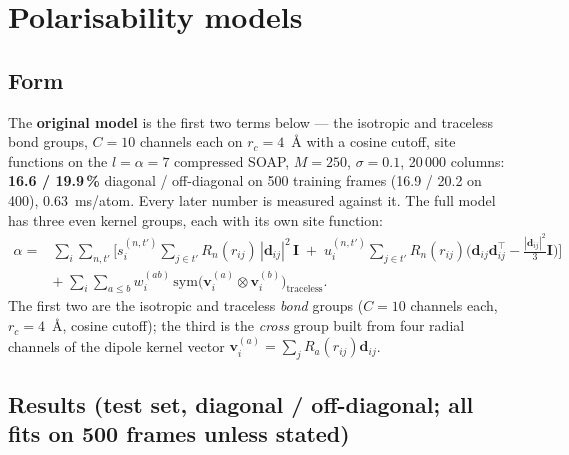 \documentclass[11pt,a4paper]{article}
\begin{document}
\section{Polarisability models}\label{sec:pol}

\subsection{Form}\label{sec:pol-form}

The \textbf{original model} is the first two terms below --- the isotropic and traceless bond
groups, $C=10$ channels each on $r_c=4$~\AA{} with a cosine cutoff, site functions on the
$l=\alpha=7$ compressed SOAP, $M=250$, $\sigma=0.1$, 20\,000 columns: \textbf{16.6 / 19.9\,\%}
diagonal / off-diagonal on 500 training frames (16.9 / 20.2 on 400), 0.63~ms/atom. Every later
number is measured against it. The full model has three even kernel groups, each with its own site
function:
\begin{equation}
\begin{array}{rl}
\alpha = & \displaystyle \sum_i\sum_{n,t'}\Big[
 s^{(n,t')}_i \sum_{j\in t'} R_n(r_{ij})\,|\mathbf d_{ij}|^2\,\mathbf I
\;+\;
 u^{(n,t')}_i \sum_{j\in t'} R_n(r_{ij})\Big(\mathbf d_{ij}\mathbf d_{ij}^\top - \frac{|\mathbf d_{ij}|^2}{3}\mathbf I\Big)\Big] \\[2ex]
 & \displaystyle +\;\sum_i\sum_{a\le b} w^{(ab)}_i\,\mathrm{sym}\big(\mathbf v^{(a)}_i\otimes\mathbf v^{(b)}_i\big)_{\mathrm{traceless}} .
\end{array}
\label{eq:pol-form}
\end{equation}
The first two are the isotropic and traceless \emph{bond} groups ($C=10$ channels each,
$r_c = 4$~\AA{}, cosine cutoff); the third is the \emph{cross} group built from four radial
channels of the dipole kernel vector $\mathbf v^{(a)}_i=\sum_j R_a(r_{ij})\mathbf d_{ij}$.

\subsection{Results (test set, diagonal / off-diagonal; all fits on 500 frames unless stated)}\label{sec:pol-results}
\end{document}
